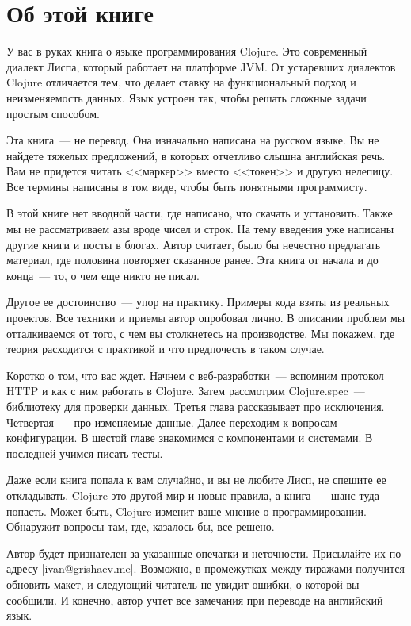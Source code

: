 \chapter*{Об этой книге}

У вас в руках книга о языке программирования Clojure. Это современный диалект
Лиспа, который работает на платформе JVM. От устаревших диалектов Clojure
отличается тем, что делает ставку на функциональный подход и неизменяемость
данных. Язык устроен так, чтобы решать сложные задачи простым способом.

Эта книга~--- не перевод. Она изначально написана на русском языке. Вы не
найдете тяжелых предложений, в которых отчетливо слышна английская речь. Вам не
придется читать <<маркер>> вместо <<токен>> и другую нелепицу. Все термины написаны
в том виде, чтобы быть понятными программисту.

В этой книге нет вводной части, где написано, что скачать и установить. Также мы
не рассматриваем азы вроде чисел и строк. На тему введения уже написаны другие
книги и посты в блогах. Автор считает, было бы нечестно предлагать материал, где
половина повторяет сказанное ранее. Эта книга от начала и до конца~--- то, о чем
еще никто не писал.

Другое ее достоинство~--- упор на практику. Примеры кода взяты из реальных
проектов. Все техники и приемы автор опробовал лично. В описании проблем мы
отталкиваемся от того, с чем вы столкнетесь на производстве. Мы покажем, где
теория расходится с практикой и что предпочесть в таком случае.

Коротко о том, что вас ждет. Начнем с веб-разработки~--- вспомним протокол HTTP
и как с ним работать в Clojure. Затем рассмотрим Clojure.spec~--- библиотеку для
проверки данных. Третья глава рассказывает про исключения. Четвертая~--- про
изменяемые данные. Далее переходим к вопросам конфигурации. В шестой главе
знакомимся с компонентами и системами. В последней учимся писать тесты.

Даже если книга попала к вам случайно, и вы не любите Лисп, не спешите ее
откладывать. Clojure это другой мир и новые правила, а книга~--- шанс туда
попасть. Может быть, Clojure изменит ваше мнение о программировании. Обнаружит
вопросы там, где, казалось бы, все решено.

Автор будет признателен за указанные опечатки и неточности. Присылайте их по
адресу \spverb|ivan@grishaev.me|. Возможно, в промежутках между тиражами
получится обновить макет, и следующий читатель не увидит ошибки, о которой вы
сообщили. И конечно, автор учтет все замечания при переводе на английский язык.

